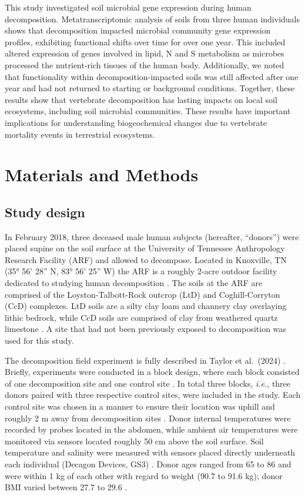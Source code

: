 \documentclass[
  sn-nature,
  lineno, referee]{sn-jnl}
\begin{document}
This study investigated soil microbial gene expression during human
decomposition. Metatranscriptomic analysis of soils from three human
individuals shows that decomposition impacted microbial community gene
expression profiles, exhibiting functional shifts over time for over one
year. This included altered expression of genes involved in lipid, N and
S metabolism as microbes processed the nutrient-rich tissues of the
human body. Additionally, we noted that functionality within
decomposition-impacted soils was still affected after one year and had
not returned to starting or background conditions. Together, these
results show that vertebrate decomposition has lasting impacts on local
soil ecosystems, including soil microbial communities. These results
have important implications for understanding biogeochemical changes due
to vertebrate mortality events in terrestrial ecosystems.

\section{Materials and Methods}\label{materials-and-methods}

\subsection{Study design}\label{study-design}

In February 2018, three deceased male human subjects (hereafter,
``donors'') were placed supine on the soil surface at the University of
Tennessee Anthropology Research Facility (ARF) and allowed to decompose.
Located in Knoxville, TN (35° 56' 28'' N, 83° 56' 25'' W) the ARF is a
roughly 2-acre outdoor facility dedicated to studying human
decomposition \citep{keenan_spatial_2018}. The soils at the ARF are
comprised of the Loyston-Talbott-Rock outcrop (LtD) and Coghill-Corryton
(CcD) complexes. LtD soils are a silty clay loam and channery clay
overlaying lithic bedrock, while CcD soils are comprised of clay from
weathered quartz limestone
\citep{keenan_spatial_2018, taylor_transient_2024}. A site that had not
been previously exposed to decomposition was used for this study.

The decomposition field experiment is fully described in Taylor et
al.~(2024) \citep{taylor_transient_2024}. Briefly, experiments were
conducted in a block design, where each block consisted of one
decomposition site and one control site \citep{taylor_transient_2024}.
In total three blocks, \emph{i.e.}, three donors paired with three
respective control sites, were included in the study. Each control site
was chosen in a manner to ensure their location was uphill and roughly 2
m away from decomposition sites \citep{taylor_transient_2024}. Donor
internal temperatures were recorded by probes located in the abdomen,
while ambient air temperatures were monitored via sensors located
roughly 50 cm above the soil surface. Soil temperature and salinity were
measured with sensors placed directly underneath each individual
(Decagon Devices, GS3) \citep{taylor_transient_2024}. Donor ages ranged
from 65 to 86 and were within 1 kg of each other with regard to weight
(90.7 to 91.6 kg); donor BMI varied between 27.7 to 29.6
\citep{taylor_transient_2024}.
\end{document}

